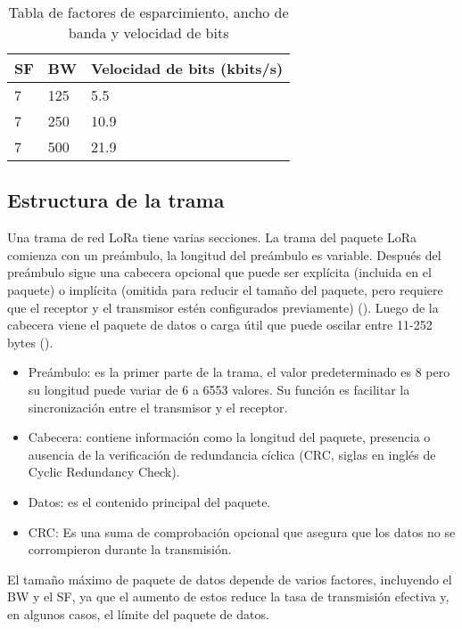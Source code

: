 \begin{table}[h!]
    \centering
    \caption{Tabla de factores de esparcimiento, ancho de banda y velocidad de bits}
    \begin{tabular}{p{3cm}p{3cm}p{6cm}}
        \toprule
        \textbf{SF} & \textbf{BW} & \textbf{Velocidad de bits (kbits/s)} \\ 
        \midrule
        7 & 125 & 5.5 \\ 
        7 & 250 & 10.9 \\ 
        7 & 500 & 21.9 \\ 
        \bottomrule
    \end{tabular}
    \label{tab:table_sfx}
\end{table}

\subsection{Estructura de la trama}

Una trama de red LoRa tiene varias secciones. La trama del paquete LoRa comienza con un preámbulo, la longitud del preámbulo es variable. Después del preámbulo sigue una cabecera opcional que puede ser explícita (incluida en el paquete) o implícita (omitida para reducir el tamaño del paquete, pero requiere que el receptor y el transmisor estén configurados previamente) (\cite{bouguera2018}). Luego de la cabecera viene el paquete de datos o carga útil que puede oscilar entre 11-252 bytes (\cite{morales2021}). 

\begin{itemize}
   \item Preámbulo: es la primer parte de la trama, el valor predeterminado es 8 pero su longitud puede variar de 6 a 6553 valores. Su función es facilitar la sincronización entre el transmisor y el receptor.
   \item Cabecera: contiene información como la longitud del paquete, presencia o ausencia de la verificación de redundancia cíclica (CRC, siglas en inglés de Cyclic Redundancy Check).
   \item Datos: es el contenido principal del paquete.
   \item CRC: Es una suma de comprobación opcional que asegura que los datos no se corrompieron durante la transmisión.
\end{itemize}

\vspace{0.5cm}

El tamaño máximo de paquete de datos depende de varios factores, incluyendo el BW y el SF, ya que el aumento de estos reduce la tasa de transmisión efectiva y, en algunos casos, el límite del paquete de datos.

